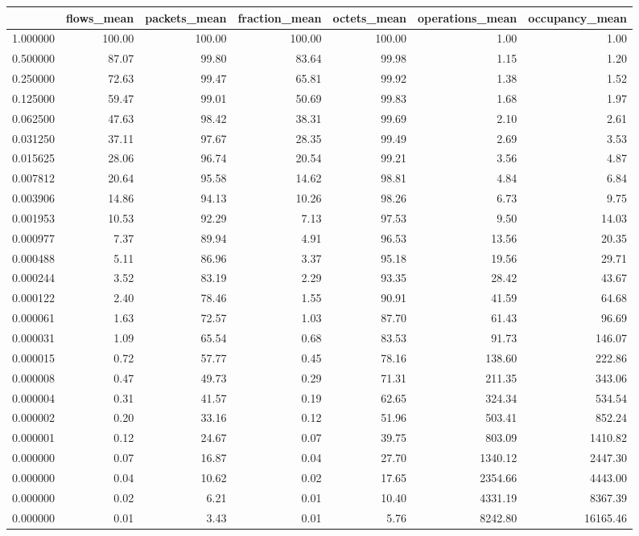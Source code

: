 \begin{tabular}{lrrrrrr}
\toprule
 & flows_mean & packets_mean & fraction_mean & octets_mean & operations_mean & occupancy_mean \\
\midrule
1.000000 & 100.00 & 100.00 & 100.00 & 100.00 & 1.00 & 1.00 \\
0.500000 & 87.07 & 99.80 & 83.64 & 99.98 & 1.15 & 1.20 \\
0.250000 & 72.63 & 99.47 & 65.81 & 99.92 & 1.38 & 1.52 \\
0.125000 & 59.47 & 99.01 & 50.69 & 99.83 & 1.68 & 1.97 \\
0.062500 & 47.63 & 98.42 & 38.31 & 99.69 & 2.10 & 2.61 \\
0.031250 & 37.11 & 97.67 & 28.35 & 99.49 & 2.69 & 3.53 \\
0.015625 & 28.06 & 96.74 & 20.54 & 99.21 & 3.56 & 4.87 \\
0.007812 & 20.64 & 95.58 & 14.62 & 98.81 & 4.84 & 6.84 \\
0.003906 & 14.86 & 94.13 & 10.26 & 98.26 & 6.73 & 9.75 \\
0.001953 & 10.53 & 92.29 & 7.13 & 97.53 & 9.50 & 14.03 \\
0.000977 & 7.37 & 89.94 & 4.91 & 96.53 & 13.56 & 20.35 \\
0.000488 & 5.11 & 86.96 & 3.37 & 95.18 & 19.56 & 29.71 \\
0.000244 & 3.52 & 83.19 & 2.29 & 93.35 & 28.42 & 43.67 \\
0.000122 & 2.40 & 78.46 & 1.55 & 90.91 & 41.59 & 64.68 \\
0.000061 & 1.63 & 72.57 & 1.03 & 87.70 & 61.43 & 96.69 \\
0.000031 & 1.09 & 65.54 & 0.68 & 83.53 & 91.73 & 146.07 \\
0.000015 & 0.72 & 57.77 & 0.45 & 78.16 & 138.60 & 222.86 \\
0.000008 & 0.47 & 49.73 & 0.29 & 71.31 & 211.35 & 343.06 \\
0.000004 & 0.31 & 41.57 & 0.19 & 62.65 & 324.34 & 534.54 \\
0.000002 & 0.20 & 33.16 & 0.12 & 51.96 & 503.41 & 852.24 \\
0.000001 & 0.12 & 24.67 & 0.07 & 39.75 & 803.09 & 1410.82 \\
0.000000 & 0.07 & 16.87 & 0.04 & 27.70 & 1340.12 & 2447.30 \\
0.000000 & 0.04 & 10.62 & 0.02 & 17.65 & 2354.66 & 4443.00 \\
0.000000 & 0.02 & 6.21 & 0.01 & 10.40 & 4331.19 & 8367.39 \\
0.000000 & 0.01 & 3.43 & 0.01 & 5.76 & 8242.80 & 16165.46 \\
\bottomrule
\end{tabular}
